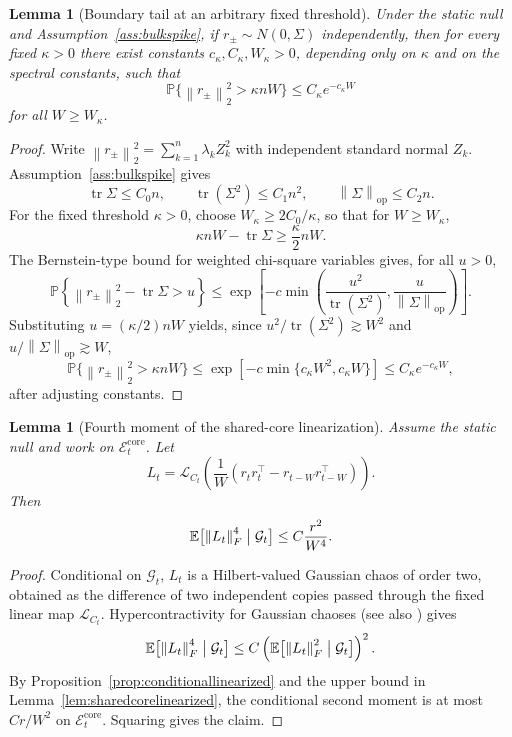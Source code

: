 \documentclass[11pt]{article}
\theoremstyle{tightplain}
\newtheorem{lemma}[theorem]{Lemma}
\theoremstyle{tightdef}
\DeclareMathOperator{\tr}{tr}
\DeclareMathOperator{\op}{op}
\newcommand{\E}{\mathbb E}
\newcommand{\Prob}{\mathbb P}
\newcommand{\norm}[1]{\left\lVert #1 \right\rVert}
\begin{document}
\begin{lemma}[Boundary tail at an arbitrary fixed threshold]\label{lem:tiptail}
Under the static null and Assumption~\ref{ass:bulkspike}, if
$r_\pm\sim N(0,\Sigma)$ independently, then for every fixed $\kappa>0$ there
exist constants $c_\kappa,C_\kappa,W_\kappa>0$, depending only on $\kappa$ and
on the spectral constants, such that
\[
\Prob\bigl\{\norm{r_\pm}_2^2>\kappa nW\bigr\}
\le
C_\kappa e^{-c_\kappa W}
\]
for all $W\ge W_\kappa$.
\end{lemma}

\begin{proof}
Write $\norm{r_\pm}_2^2=\sum_{k=1}^n\lambda_k Z_k^2$ with independent standard
normal $Z_k$. Assumption~\ref{ass:bulkspike} gives
\[
\tr\Sigma\le C_0 n,
\qquad
\tr(\Sigma^2)\le C_1 n^2,
\qquad
\norm{\Sigma}_{\op}\le C_2 n.
\]
For the fixed threshold $\kappa>0$, choose $W_\kappa\ge 2C_0/\kappa$, so that
for $W\ge W_\kappa$,
\[
\kappa nW-\tr\Sigma\ge \frac{\kappa}{2}nW.
\]
The Bernstein-type bound for weighted chi-square variables
\cite{LaurentMassart2000,HsuKakadeZhang2012} gives, for all $u>0$,
\[
\Prob\left\{\norm{r_\pm}_2^2-\tr\Sigma>u\right\}
\le
\exp\left[-c\min\left(\frac{u^2}{\tr(\Sigma^2)},\frac{u}{\norm{\Sigma}_{\op}}\right)\right].
\]
Substituting $u=(\kappa/2)nW$ yields, since $u^2/\tr(\Sigma^2)\gtrsim W^2$ and
$u/\norm{\Sigma}_{\op}\gtrsim W$,
\[
\Prob\bigl\{\norm{r_\pm}_2^2>\kappa nW\bigr\}
\le
\exp\left[-c\min\{c_\kappa W^2,c_\kappa W\}\right]
\le
C_\kappa e^{-c_\kappa W},
\]
after adjusting constants.
\end{proof}

\begin{lemma}[Fourth moment of the shared-core linearization]\label{lem:sharedcorefourth}
Assume the static null and work on $\mathcal E_t^{\mathrm{core}}$. Let
\[
L_t=\mathcal L_{C_t}\left(\frac1W(r_t r_t^\top-r_{t-W}r_{t-W}^\top)\right).
\]
Then
\[
\E\bigl[\norm{L_t}_F^4\bigm|\mathcal G_t\bigr]
\le
C\frac{r^2}{W^4}.
\]
\end{lemma}

\begin{proof}
Conditional on $\mathcal G_t$, $L_t$ is a Hilbert-valued Gaussian chaos of
order two, obtained as the difference of two independent copies passed through
the fixed linear map $\mathcal L_{C_t}$. Hypercontractivity for Gaussian
chaoses \cite[Ch.~5--6]{Janson1997} (see also \cite{Nelson1973}) gives
\[
\E\bigl[\norm{L_t}_F^4\bigm|\mathcal G_t\bigr]
\le
C\left(\E\bigl[\norm{L_t}_F^2\bigm|\mathcal G_t\bigr]\right)^2.
\]
By Proposition~\ref{prop:conditionallinearized} and the upper bound in
Lemma~\ref{lem:sharedcorelinearized}, the conditional second moment is at most
$Cr/W^2$ on $\mathcal E_t^{\mathrm{core}}$. Squaring gives the claim.
\end{proof}
\end{document}
